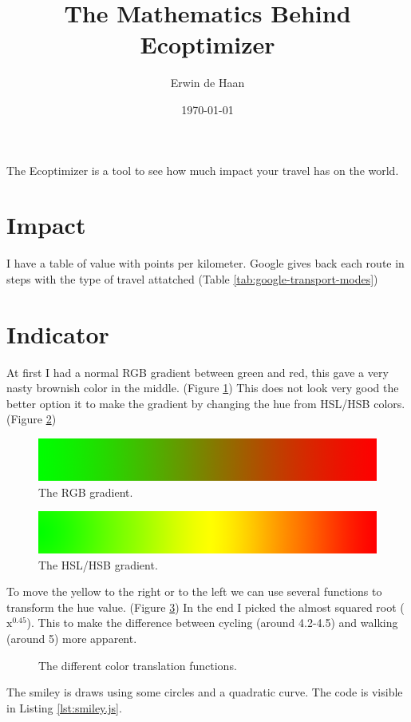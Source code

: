 \documentclass[final,a4paper,11pt]{article}
\author{Erwin de Haan}
\title{The Mathematics Behind Ecoptimizer}
\date{\today}
\begin{document}
\maketitle
The Ecoptimizer is a tool to see how much impact your travel has on the world.
\section{Impact}
I have a table of value with points per kilometer. Google gives back each route in steps with the type of travel attatched (Table \ref{tab:google-transport-modes})
\section{Indicator}
At first I had a normal RGB gradient between green and red, this gave a very nasty brownish color in the middle. (Figure \ref{fig:green-to-red-rgb})
This does not look very good the better option it to make the gradient by changing the hue from HSL/HSB colors. (Figure \ref{fig:green-to-red-hsb})
\begin{figure}[H]
	\centering	
	\includegraphics[width=\textwidth]{resources/green-to-red-rgb.png}
	\caption{The RGB gradient.}
	\label{fig:green-to-red-rgb}
\end{figure}
\begin{figure}[H]
	\centering	
	\includegraphics[width=\textwidth]{resources/green-to-red-hsb.png}
	\caption{The HSL/HSB gradient.}
	\label{fig:green-to-red-hsb}
\end{figure}

To move the yellow to the right or to the left we can use several functions to transform the hue value. (Figure \ref{fig:colors}) In the end I picked the almost squared root ($\text{x}^\text{0.45}$). This to make the difference between cycling (around 4.2-4.5) and walking (around 5) more apparent.

\begin{figure}[H]
	\centering
	\setlength\figureheight{8cm}
    	\setlength{}
	
	\caption{The different color translation functions.}
	\label{fig:colors}
\end{figure}

The smiley is draws using some circles and a quadratic curve. The code is visible in Listing \ref{lst:smiley.js}.


\end{document}
